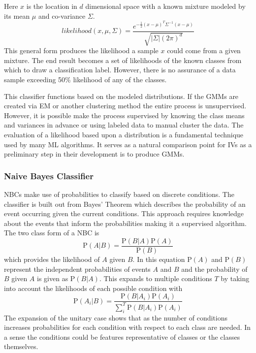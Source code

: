 Here $x$ is the location in $d$ dimensional space with a known mixture modeled by its mean $\mu$ and co-variance $\Sigma$.
\begin{equation}
likelihood(x,\mu,\Sigma) = \frac{e^{-\frac{1}{2}(x-\mu)^{T}\Sigma^{-1}(x-\mu)}}{\sqrt{\lvert\Sigma\rvert(2\pi)^{d}}}
\end{equation}
This general form produces the likelihood a sample $x$ could come from a given mixture. The end result becomes a set of likelihoods of the known classes from which to draw a classification label. However, there is no assurance of a data sample exceeding 50\% likelihood of any of the classes.

This classifier functions based on the modeled distributions. If the \acp{GMM} are created via \ac{EM} or another clustering method the entire process is unsupervised. However, it is possible make the process supervised by knowing the class means and variances in advance or using labeled data to manual cluster the data. The evaluation of a likelihood based upon a distribution is a fundamental technique used by many \ac{ML} algorithms. It serves as a natural comparison point for \acp{IV} as a preliminary step in their development is to produce \acp{GMM}.

\subsubsection{Naive Bayes Classifier}

\acp{NBC} make use of probabilities to classify based on discrete conditions. The classifier is built out from Bayes' Theorem which describes the probability of an event occurring given the current conditions. This approach requires knowledge about the events that inform the probabilities making it a supervised algorithm. The two class form of a \ac{NBC} is
\begin{equation}
\text{P}(A | B) = \frac{\text{P}(B|A)\text{P}(A)}{\text{P}(B)}
\end{equation}
which provides the likelihood of $A$ given $B$. In this equation $\text{P}(A)$ and $\text{P}(B)$ represent the independent probabilities of events $A$ and $B$ and the probability of $B$ given $A$ is given as $\text{P}(B|A)$. This expands to multiple conditions $T$ by taking into account the likelihoods of each possible condition with
\begin{equation}
\text{P}(A_{i} | B ) = \frac{\text{P}(B|A_{i})\text{P}(A_{i})}{\sum_{i}^{T}\text{P}(B|A_{i})\text{P}(A_{i})}
\end{equation}
The expansion of the unitary case shows that as the number of conditions increases probabilities for each condition with respect to each class are needed. In a sense the conditions could be features representative of classes or the classes themselves.

